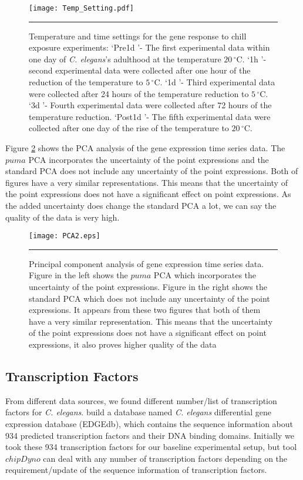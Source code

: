 \begin{figure}
	\centering
		\texttt{[image: Temp\_Setting.pdf]}
		\rule{35em}{0.5pt}
	\caption[Temperature and time settings for the gene response to chill exposure experiments]
		{Temperature and time settings for the gene response to chill exposure experiments:  \lq Pre1d \rq- The first experimental data within one day of \textit{C. elegans}'s adulthood at the temperature $20\,^{\circ}\mathrm{C}$. \lq 1h \rq- second experimental data were collected after one hour of the reduction of the temperature to $5\,^{\circ}\mathrm{C}$. \lq 1d \rq- Third experimental data were collected after 24 hours of the temperature reduction to $5\,^{\circ}\mathrm{C}$. \lq 3d \rq- Fourth experimental data were collected after 72 hours of the temperature reduction. \lq Post1d \rq- The fifth experimental data were collected after one day of the rise of the temperature to $20\,^{\circ}\mathrm{C}$.}
	\label{fig:Temp_Settings}
\end{figure}

Figure \ref{fig:PCA_time_series} shows the PCA analysis of the gene expression time series data. The $puma$ PCA incorporates the uncertainty of the point expressions and the standard PCA does not include any uncertainty of the point expressions. Both of figures have a very similar representations. This means that the uncertainty of the point expressions does not have a significant effect on point expressions. As the added uncertainty does change the standard PCA a lot, we can say the quality of the data is very high.
\begin{figure}
	\centering
		\texttt{[image: PCA2.eps]}
		\rule{35em}{0.5pt}
	\caption[Principal component analysis of gene expression time series data ]
		{Principal component analysis of gene expression time series data. Figure in the left shows the $puma$ PCA which incorporates the uncertainty of the point  expressions. Figure in the right shows the standard PCA which does not include any uncertainty of the point  expressions. It appears from these two figures that both of them have a very similar representation. This means that the uncertainty of the point expressions does not have a significant effect on point expressions, it also proves higher quality of the data}
	\label{fig:PCA_time_series}
\end{figure}

\subsection{Transcription Factors}
From different data sources, we found different number/list of transcription factors for \textit{C. elegans}. \cite{Inmaculada:2007} build a database named \textit{C. elegans} differential gene expression database (EDGEdb), which contains the sequence information about 934 predicted transcription factors and their DNA binding domains. Initially we took these 934 transcription factors for our baseline experimental setup, but tool $chipDyno$ can deal with any number of transcription factors depending on the requirement/update of the sequence information of transcription factors.

